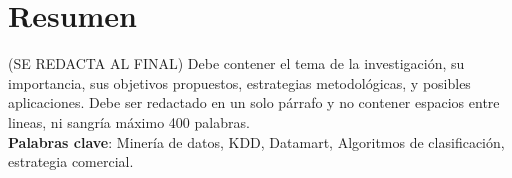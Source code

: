\newpage
{}
{}
\section*{Resumen}
	(SE REDACTA AL FINAL) Debe contener el tema de la investigación, su importancia, sus objetivos propuestos, estrategias metodológicas, y posibles aplicaciones. Debe ser redactado en un solo párrafo y no contener espacios entre lineas, ni sangría máximo 400 palabras.\\

\noindent
\textbf{Palabras clave}: Minería de datos, KDD, Datamart, Algoritmos de clasificación, estrategia comercial.
